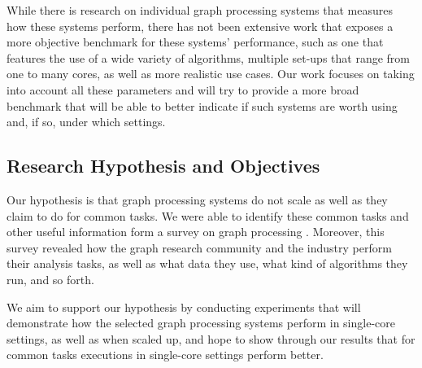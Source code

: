 \documentclass[a4paper,11pt]{article}
\begin{document}
\par While there is research on individual graph processing systems that measures how these systems perform, there has not been extensive work that exposes a more objective benchmark for these systems' performance, such as one that features the use of a wide variety of algorithms, multiple set-ups that range from one to many cores, as well as more realistic use cases. Our work focuses on taking into account all these parameters and will try to provide a more broad benchmark that will be able to better indicate if such systems are worth using and, if so, under which settings.


\subsection{Research Hypothesis and Objectives} \label{hypothesis}

\par Our hypothesis is that graph processing systems do not scale as well as they claim to do for common tasks. We were able to identify these common tasks and other useful information form a survey on graph processing \cite{survey}. Moreover, this survey revealed how the graph research community and the industry perform their analysis tasks, as well as what data they use, what kind of algorithms they run, and so forth.

\par We aim to support our hypothesis by conducting experiments that will demonstrate how the selected graph processing systems perform in single-core settings, as well as when scaled up, and hope to show through our results that for common tasks executions in single-core settings perform better.

\end{document}
